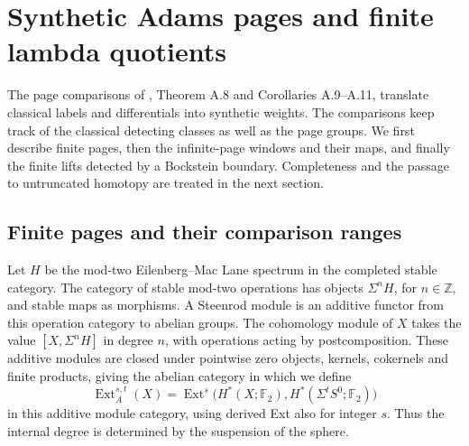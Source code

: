 \section{Synthetic Adams pages and finite lambda quotients}
The page comparisons of \cite{BHS}, Theorem A.8 and Corollaries A.9--A.11,
translate classical labels and differentials into synthetic weights.
The comparisons keep track of the classical detecting classes as well
as the page groups. We first describe finite pages, then the infinite-page
windows and their maps, and finally the finite lifts detected by a
Bockstein boundary. Completeness and the passage to untruncated homotopy
are treated in the next section.

\subsection{Finite pages and their comparison ranges}

\begin{definition}
\label{sem:Literature:steenrod-ext}
Let $H$ be the mod-two Eilenberg--Mac Lane spectrum in the completed
stable category. The category of stable mod-two operations has objects
$\Sigma^nH$, for $n\in\mathbb Z$, and stable maps as morphisms.
A Steenrod module is an additive functor from this operation category to
abelian groups. The cohomology module of $X$ takes the value
$[X,\Sigma^nH]$ in degree $n$, with operations acting by postcomposition.
These additive modules are closed under pointwise zero objects, kernels,
cokernels and finite products, giving the abelian category in which we
define
\[
\operatorname{Ext}_A^{s,t}(X)
 =\operatorname{Ext}^s\bigl(H^*(X;\mathbb F_2),
     H^*(\Sigma^tS^0;\mathbb F_2)\bigr)
\]
in this additive module category, using derived Ext also for integer $s$.
Thus the internal degree is determined by the suspension of the sphere.


\end{definition}

